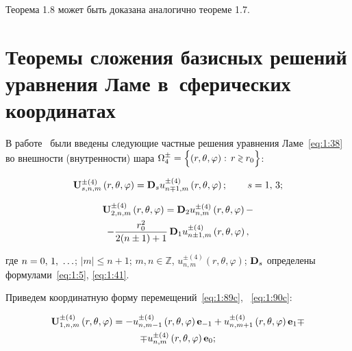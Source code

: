 \begin{russian}
Теорема 1.8 может быть доказана аналогично теореме 1.7.

\section[Теоремы сложения базисных решений уравнения Ламе в сферических координатах]{Теоремы сложения базисных решений уравнения Ламе в~сферических координатах}

В работе~\cite{Nikolaev1984} были введены следующие частные решения уравнения Ламе~\eqref{eq:1:38} во внешности (внутренности) шара $\Omega _4^ \pm  = \Big\{ {\left( {r,\theta ,\varphi } \right):{\mkern 1mu} {\kern 1pt} r \mathbin{\lower.3ex\hbox{$\buildrel>\over
{\smash{\scriptstyle<}\vphantom{_x}}$}} {r_0}} \Big\}$:

\begin{equation}\label{eq:1:89c}
{\bf{U}}_{s,n,m}^{ \pm (4)}\left( {r,\theta ,\varphi } \right) = {{\bf{D}}_s}u_{n \mp 1,m}^{ \pm (4)}\left( {r,\theta ,\varphi } \right);\qquad {\kern 1pt} s = 1,{\mkern 1mu} {\kern 1pt} 3;
\end{equation}

\begin{multline}\label{eq:1:90c}
{\bf{U}}_{2,n,m}^{ \pm (4)}\left( {r,\theta ,\varphi } \right) = {{\bf{D}}_2}u_{n,m}^{ \pm (4)}\left( {r,\theta ,\varphi } \right) - \\
- \frac{{r_0^2}}{{2(n \pm 1) + 1}}\,{{\bf{D}}_1}u_{n \pm 1,m}^{ \pm (4)}\left( {r,\theta ,\varphi } \right),
\end{multline}

\noindent где $n = 0,{\mkern 1mu} {\kern 1pt} 1,{\mkern 1mu} {\kern 1pt}  \ldots $; $|m| \le n + 1$; $m,n\in\mathbb{Z}$, $u_{n,m}^{ \pm (4)}\left( {r,\theta ,\varphi } \right)$; ${{\bf{D}}_s}$ определены формулами~\eqref{eq:1:5}, \eqref{eq:1:41}.

Приведем координатную форму перемещений~\eqref{eq:1:89c}, ~\eqref{eq:1:90c}:

\begin{multline}\label{eq:1:91}
{\bf{U}}_{1,n,m}^{ \pm (4)}\left( {r,\theta ,\varphi } \right) =  - u_{n,m - 1}^{ \pm (4)}\left( {r,\theta ,\varphi } \right){{\bf{e}}_{ - 1}} + u_{n,m + 1}^{ \pm (4)}\left( {r,\theta ,\varphi } \right){{\bf{e}}_1} \mp \\
\mp u_{n,m}^{ \pm (4)}\left( {r,\theta ,\varphi } \right){{\bf{e}}_0};
\end{multline}


\end{russian}
